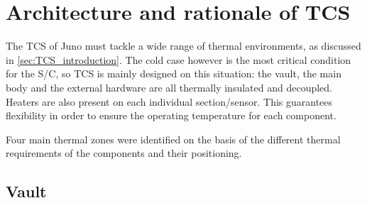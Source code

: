 \section{Architecture and rationale of TCS}
\label{sec:TCS_architecture_rationale}

The TCS of Juno must tackle a wide range of thermal environments, as discussed in \autoref{sec:TCS_introduction}.
The cold case however is the most critical condition for the S/C, so TCS is mainly designed on this situation: the vault, the main body and the external hardware are all thermally insulated and decoupled. Heaters are also present on each individual section/sensor. This guarantees flexibility in order to ensure the operating temperature for each component.


\vspace*{-3mm}

Four main thermal zones were identified on the basis of the different thermal requirements of the components and their positioning. 

\subsection{Vault}
\label{subsec:vault}

